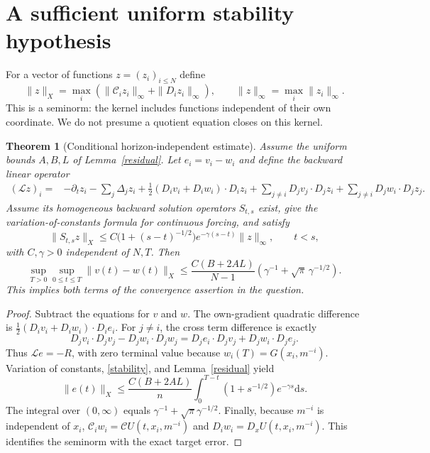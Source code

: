 \documentclass[11pt]{article}
\newtheorem{theorem}{Theorem}
\newcommand{\dd}{\mathrm d}
\begin{document}
\section{A sufficient uniform stability hypothesis}
For a vector of functions $z=(z_i)_{i\le N}$ define
\[
 \|z\|_X=\max_i(\|\mathcal C_i z_i\|_\infty+\|D_i z_i\|_\infty),
 \qquad \|z\|_\infty=\max_i\|z_i\|_\infty.
\]
This is a seminorm: the kernel includes functions independent of their own coordinate. We do not presume a quotient equation closes on this kernel.
\begin{theorem}[Conditional horizon-independent estimate]\label{conditional}
Assume the uniform bounds $A,B,L$ of Lemma~\ref{residual}. Let $e_i=v_i-w_i$ and define the backward linear operator
\begin{align*}
 (\mathcal L z)_i={}&-\partial_tz_i-\sum_j\Delta_jz_i
 +\tfrac12(D_iv_i+D_iw_i)\cdot D_iz_i
 +\sum_{j\ne i}D_jv_j\cdot D_jz_i
 +\sum_{j\ne i}D_jw_i\cdot D_jz_j.
\end{align*}
Assume its homogeneous backward solution operators $S_{t,s}$ exist, give the variation-of-constants formula for continuous forcing, and satisfy
\begin{equation}\label{stability}
 \|S_{t,s}z\|_X\le C\bigl(1+(s-t)^{-1/2}\bigr)e^{-\gamma(s-t)}\|z\|_\infty,
 \qquad t<s,
\end{equation}
with $C,\gamma>0$ independent of $N,T$. Then
\[
 \sup_{T>0}\sup_{0\le t\le T}\|v(t)-w(t)\|_X
 \le\frac{C(B+2AL)}{N-1}\left(\gamma^{-1}+\sqrt\pi\,\gamma^{-1/2}\right).
\]
This implies both terms of the convergence assertion in the question.
\end{theorem}
\begin{proof}
Subtract the equations for $v$ and $w$. The own-gradient quadratic difference is
$\tfrac12(D_iv_i+D_iw_i)\cdot D_ie_i$. For $j\ne i$, the cross term difference is exactly
\[
 D_jv_i\cdot D_jv_j-D_jw_i\cdot D_jw_j
 =D_je_i\cdot D_jv_j+D_jw_i\cdot D_je_j.
\]
Thus $\mathcal Le=-R$, with zero terminal value because $w_i(T)=G(x_i,m^{-i})$. Variation of constants, \eqref{stability}, and Lemma~\ref{residual} yield
\[
 \|e(t)\|_X\le\frac{C(B+2AL)}n\int_0^{T-t}(1+s^{-1/2})e^{-\gamma s}\dd s.
\]
The integral over $(0,\infty)$ equals $\gamma^{-1}+\sqrt\pi\gamma^{-1/2}$. Finally, because $m^{-i}$ is independent of $x_i$, $\mathcal C_iw_i=\mathcal CU(t,x_i,m^{-i})$ and $D_iw_i=D_xU(t,x_i,m^{-i})$. This identifies the seminorm with the exact target error.
\end{proof}
\end{document}
